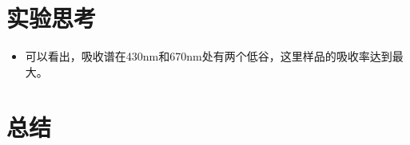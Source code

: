 \documentclass{ctexart}
\begin{document}
\section{实验思考}
\begin{itemize}
    \item 可以看出，吸收谱在430nm和670nm处有两个低谷，这里样品的吸收率达到最大。
\end{itemize}
\section{总结}
\end{document}
